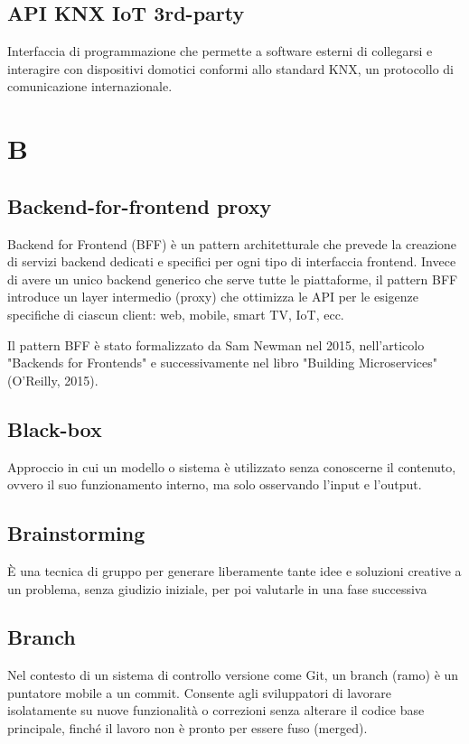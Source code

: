 \documentclass[10pt, letterpaper]{article}
\begin{document}
\subsection*{API KNX IoT 3rd-party}
Interfaccia di programmazione che permette a software esterni di collegarsi e interagire con dispositivi domotici conformi allo standard KNX,
un protocollo di comunicazione internazionale.

\section{B}

\subsection*{Backend-for-frontend proxy}
Backend for Frontend (BFF) è un pattern architetturale che prevede la creazione di servizi backend dedicati e specifici per ogni tipo di interfaccia frontend. Invece di avere un unico backend generico che serve tutte le piattaforme, il pattern BFF introduce un layer intermedio (proxy) che ottimizza le API per le esigenze specifiche di ciascun client: web, mobile, smart TV, IoT, ecc.

Il pattern BFF è stato formalizzato da Sam Newman nel 2015, nell'articolo "Backends for Frontends" e successivamente nel libro "Building Microservices" (O'Reilly, 2015).

\subsection*{Black-box}
Approccio in cui un modello o sistema è utilizzato senza conoscerne il contenuto, ovvero il suo funzionamento interno, ma solo osservando l'input e l'output.

\subsection*{Brainstorming}
È una tecnica di gruppo per generare liberamente tante idee e soluzioni creative a un problema, senza giudizio iniziale, per poi valutarle in una fase successiva

\subsection*{Branch}
Nel contesto di un sistema di controllo versione come Git, un branch (ramo) è un puntatore mobile a un commit. Consente agli sviluppatori di lavorare isolatamente su nuove
funzionalità o correzioni senza alterare il codice base principale, finché il lavoro non è pronto per essere fuso (merged).
\end{document}
